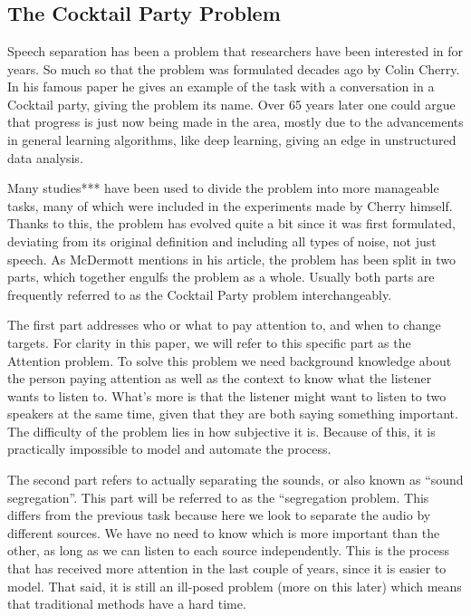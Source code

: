 \documentclass{book}
\begin{document}
\chapter{}
\section{The Cocktail Party Problem}
\qquad Speech separation has been a problem that researchers have been interested in for years. So much so that the problem was formulated decades ago by Colin Cherry\cite{Cherry}. In his famous paper he gives an example of the task with a conversation in a Cocktail party, giving the problem its name. Over 65 years later one could argue that progress is just now being made in the area, mostly due to the advancements in general learning algorithms, like deep learning, giving an edge in unstructured data analysis.
\par
Many studies*** have been used to divide the problem into more manageable tasks, many of which were included in the experiments made by Cherry himself. Thanks to this, the problem has evolved quite a bit since it was first formulated, deviating from its original definition and including all types of noise, not just speech. As McDermott mentions in his article\cite{CocktailPartyProblemRevisit}, the problem has been split in two parts, which together engulfs the problem as a whole. Usually both parts are frequently referred to as the Cocktail Party problem interchangeably.
\par
The first part addresses who or what to pay attention to, and when to change targets. For clarity in this paper, we will refer to this specific part as the Attention problem. To solve this problem we need background knowledge about the person paying attention as well as the context to know what the listener wants to listen to. What's more is that the listener might want to listen to two speakers at the same time, given that they are both saying something important. The difficulty of the problem lies in how subjective it is. Because of this, it is practically impossible to model and automate the process.
\par
The second part refers to actually separating the sounds, or also known as “sound segregation”. This part will be referred to as the “segregation problem. This differs from the previous task because here we look to separate the audio by different sources. We have no need to know which is more important than the other, as long as we can listen to each source independently. This is the process that has received more attention in the last couple of years, since it is easier to model. That said, it is still an ill-posed problem (more on this later) which means that traditional methods have a hard time.
\end{document}
